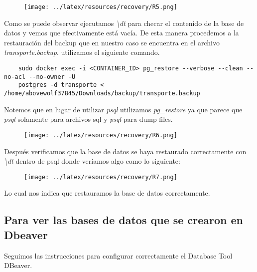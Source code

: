 \begin{figure}[H]
    \centering
        \texttt{[image: ../latex/resources/recovery/R5.png]}
\end{figure}

Como se puede observar ejecutamos \textit{\textbackslash dt} para checar el contenido de la base de datos y vemos que efectivamente está vacía. De esta manera procedemos a la restauración del backup que en nuestro caso se encuentra en el archivo \textit{transporte.backup}. utilizamos el siguiente comando. \vspace{0.3cm}

\begin{verbatim}
    sudo docker exec -i <CONTAINER_ID> pg_restore --verbose --clean --no-acl --no-owner -U 
    postgres -d transporte < /home/abovewolf37845/Downloads/backup/transporte.backup
\end{verbatim}

Notemos que en lugar de utilizar \textit{psql} utilizamos \textit{pg\_restore} ya que parece que \textit{psql} solamente para archivos sql y \textit{psql} para dump files. \vspace{0.3cm}

\begin{figure}[H]
    \centering
        \texttt{[image: ../latex/resources/recovery/R6.png]}
\end{figure}

\newpage

Después verificamos que la base de datos se haya restaurado correctamente con \textit{\textbackslash dt} dentro de psql donde veríamos algo como lo siguiente: \vspace{0.3cm} 

\begin{figure}[H]
    \centering
        \texttt{[image: ../latex/resources/recovery/R7.png]}
\end{figure}

Lo cual nos indica que restauramos la base de datos correctamente. \vspace{0.3cm}

\subsection*{Para ver las bases de datos que se crearon en Dbeaver}

Seguimos las instrucciones para configurar correctamente el Database Tool DBeaver. \vspace{0.3cm}

